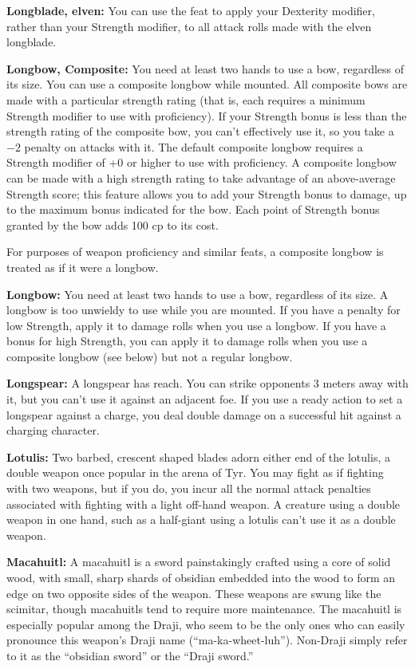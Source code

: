 \textbf{Longblade, elven:} You can use the  feat to apply your Dexterity modifier, rather than your Strength modifier, to all attack rolls made with the elven longblade.

\textbf{Longbow, Composite:} You need at least two hands to use a bow, regardless of its size. You can use a composite longbow while mounted. All composite bows are made with a particular strength rating (that is, each requires a minimum Strength modifier to use with proficiency). If your Strength bonus is less than the strength rating of the composite bow, you can't effectively use it, so you take a $-2$ penalty on attacks with it. The default composite longbow requires a Strength modifier of +0 or higher to use with proficiency. A composite longbow can be made with a high strength rating to take advantage of an above-average Strength score; this feature allows you to add your Strength bonus to damage, up to the maximum bonus indicated for the bow. Each point of Strength bonus granted by the bow adds 100 cp to its cost.

For purposes of weapon proficiency and similar feats, a composite longbow is treated as if it were a longbow. 

\textbf{Longbow:} You need at least two hands to use a bow, regardless of its size. A longbow is too unwieldy to use while you are mounted. If you have a penalty for low Strength, apply it to damage rolls when you use a longbow. If you have a bonus for high Strength, you can apply it to damage rolls when you use a composite longbow (see below) but not a regular longbow. 

\textbf{Longspear:} A longspear has reach. You can strike opponents 3 meters away with it, but you can't use it against an adjacent foe. If you use a ready action to set a longspear against a charge, you deal double damage on a successful hit against a charging character. 

\textbf{Lotulis:} Two barbed, crescent shaped blades adorn either end of the lotulis, a double weapon once popular in the arena of Tyr. You may fight as if fighting with two weapons, but if you do, you incur all the normal attack penalties associated with fighting with a light off-hand weapon. A creature using a double weapon in one hand, such as a half-giant using a lotulis can't use it as a double weapon.

\textbf{Macahuitl:} A macahuitl is a sword painstakingly crafted using a core of solid wood, with small, sharp shards of obsidian embedded into the wood to form an edge on two opposite sides of the weapon. These weapons are swung like the scimitar, though macahuitls tend to require more maintenance. The macahuitl is especially popular among the Draji, who seem to be the only ones who can easily pronounce this weapon's Draji name (``ma-ka-wheet-luh''). Non-Draji simply refer to it as the ``obsidian sword'' or the ``Draji sword.''

